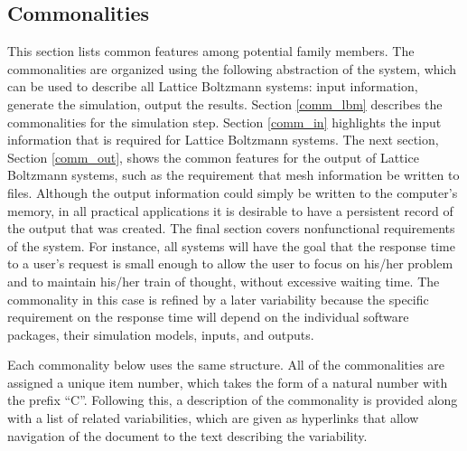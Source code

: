\documentclass[12pt, notitlepage]{article}
\begin{document}
\subsection{Commonalities}\label{comm_sec}

This section lists common features among potential family members. The commonalities are organized using the following abstraction of the system, which can be used to describe all Lattice Boltzmann systems: input information, generate the simulation, output the results. Section \ref{comm_lbm} describes the commonalities for the simulation step. Section \ref{comm_in} highlights the input information that is required for Lattice Boltzmann systems. The next section, Section \ref{comm_out}, shows the common features for the output of Lattice Boltzmann systems, such as the requirement that mesh information be written to files. Although the output information could simply be written to the computer’s memory, in all practical applications it is desirable to have a persistent record of the output that was created. The final section covers nonfunctional requirements of the system. For instance, all systems will have the goal that the response time to a user’s request is small enough to allow the user to focus on his/her problem and to maintain his/her train of thought, without excessive waiting time. The commonality in this case is refined by a later variability because the specific requirement on the response time will depend on the individual software packages, their simulation models, inputs, and outputs.

Each commonality below uses the same structure. All of the commonalities are assigned a unique item number, which takes the form of a natural number with the prefix ``C''. Following this, a description of the commonality is provided along with a list of related variabilities, which are given as hyperlinks that allow navigation of the document to the text describing the variability.  
\end{document}
